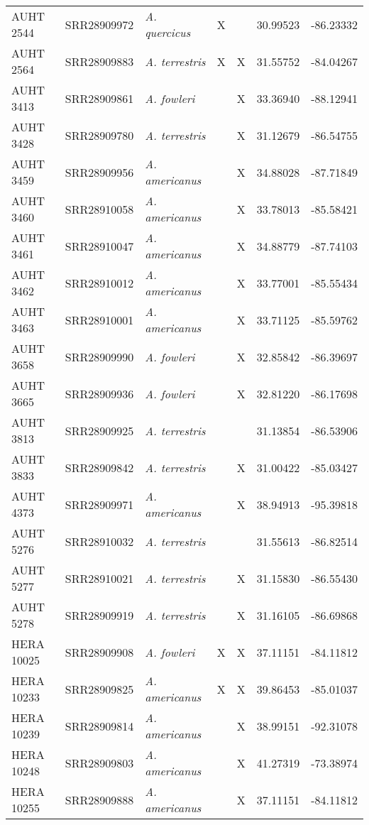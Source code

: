 \begin{longtable}{ lllllll }
AUHT 2544 & SRR28909972 & \textit{A. quercicus} & X &  & 30.99523 & -86.23332 \\ 
AUHT 2564 & SRR28909883 & \textit{A. terrestris} & X & X & 31.55752 & -84.04267 \\ 
AUHT 3413 & SRR28909861 & \textit{A. fowleri} &  & X & 33.36940 & -88.12941 \\ 
AUHT 3428 & SRR28909780 & \textit{A. terrestris} &  & X & 31.12679 & -86.54755 \\ 
AUHT 3459 & SRR28909956 & \textit{A. americanus} &  & X & 34.88028 & -87.71849 \\ 
AUHT 3460 & SRR28910058 & \textit{A. americanus} &  & X & 33.78013 & -85.58421 \\ 
AUHT 3461 & SRR28910047 & \textit{A. americanus} &  & X & 34.88779 & -87.74103 \\ 
AUHT 3462 & SRR28910012 & \textit{A. americanus} &  & X & 33.77001 & -85.55434 \\ 
AUHT 3463 & SRR28910001 & \textit{A. americanus} &  & X & 33.71125 & -85.59762 \\ 
AUHT 3658 & SRR28909990 & \textit{A. fowleri} &  & X & 32.85842 & -86.39697 \\ 
AUHT 3665 & SRR28909936 & \textit{A. fowleri} &  & X & 32.81220 & -86.17698 \\ 
AUHT 3813 & SRR28909925 & \textit{A. terrestris} &  &  & 31.13854 & -86.53906 \\ 
AUHT 3833 & SRR28909842 & \textit{A. terrestris} &  & X & 31.00422 & -85.03427 \\ 
AUHT 4373 & SRR28909971 & \textit{A. americanus} &  & X & 38.94913 & -95.39818 \\ 
AUHT 5276 & SRR28910032 & \textit{A. terrestris} &  &  & 31.55613 & -86.82514 \\ 
AUHT 5277 & SRR28910021 & \textit{A. terrestris} &  & X & 31.15830 & -86.55430 \\ 
AUHT 5278 & SRR28909919 & \textit{A. terrestris} &  & X & 31.16105 & -86.69868 \\ 
HERA 10025 & SRR28909908 & \textit{A. fowleri} & X & X & 37.11151 & -84.11812 \\ 
HERA 10233 & SRR28909825 & \textit{A. americanus} & X & X & 39.86453 & -85.01037 \\ 
HERA 10239 & SRR28909814 & \textit{A. americanus} &  & X & 38.99151 & -92.31078 \\ 
HERA 10248 & SRR28909803 & \textit{A. americanus} &  & X & 41.27319 & -73.38974 \\ 
HERA 10255 & SRR28909888 & \textit{A. americanus} &  & X & 37.11151 & -84.11812 \\ 

\end{longtable}
